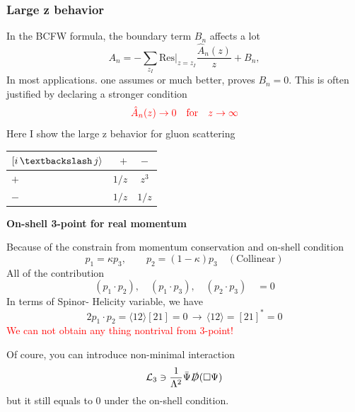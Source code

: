 \documentclass{beamer}
\newcommand{\avg}[1]{\langle #1 \rangle}
\begin{document}
\begin{frame}
    \frametitle{Large z behavior}
    In the BCFW formula, the boundary term $B_n$ affects a lot
    \begin{equation*}
        A_n=-\sum_{z_I}\mathrm{Res}|_{z=z_I}\frac{\hat{A}_n(z)}{z}+B_n,
    \end{equation*}
    In most applications. one assumes or much better, proves $B_n=0$. This is often justified by declaring a stronger condition
    \begin{equation*}
        \textcolor{red}{\hat{A}_n(z)\rightarrow 0 \quad \text{for} \quad z\rightarrow \infty} 
    \end{equation*}
    Here I show the large z behavior for gluon scattering 
    \begin{center}
        \begin{tabular}{lrc}
            \toprule
            $[i\, \textbackslash \, j\rangle $ & $+$ & $-$ \\
            \midrule
            $+$ & $1/z$ & $z^3$ \\
            $-$ & $1/z$ & $1/z$ \\
            \bottomrule
          \end{tabular}
    \end{center}
\end{frame}

\begin{frame}
        \textbf{On-shell 3-point for real momentum}

    Because of the constrain from momentum conservation and on-shell condition
    \begin{equation*}
        p_1=\kappa p_3, \qquad p_2=(1-\kappa)p_3 \quad(\text{Collinear})
    \end{equation*}
    All of the contribution 
    \begin{equation*}
        (p_1\cdot p_2),\quad (p_1\cdot p_3),\quad(p_2\cdot p_3)\quad =0  
    \end{equation*}
    In terms of Spinor- Helicity variable, we have 
    \begin{equation*}
        2p_1\cdot p_2=\avg{12}[21]=0\, \longrightarrow \,\avg{12}=[21]^*=0
    \end{equation*}
    \textcolor{red}{We can not obtain any thing nontrival from 3-point!}
    
    Of coure, you can introduce non-minimal interaction
    \begin{equation*}
        \mathcal{L}_3 \ni \frac{1}{\Lambda^2}\bar{\Psi}\slashed{D}(\Box \Psi)
    \end{equation*}
    but it still equals to 0 under the on-shell condition.
\end{frame}
\end{document}
